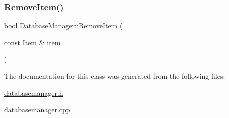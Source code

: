 \mbox{\label{class_database_manager_a13822fb9377f14b4aa1bfaf602b1498c}} 
\subsubsection{\texorpdfstring{Remove\+Item()}{RemoveItem()}}
{\footnotesize\ttfamily bool Database\+Manager\+::\+Remove\+Item (\begin{DoxyParamCaption}\item[{const \hyperlink{class_item}{Item} \&}]{item }\end{DoxyParamCaption})}



The documentation for this class was generated from the following files\+:\begin{DoxyCompactItemize}
\item 
\hyperlink{databasemanager_8h}{databasemanager.\+h}\item 
\hyperlink{databasemanager_8cpp}{databasemanager.\+cpp}\end{DoxyCompactItemize}
